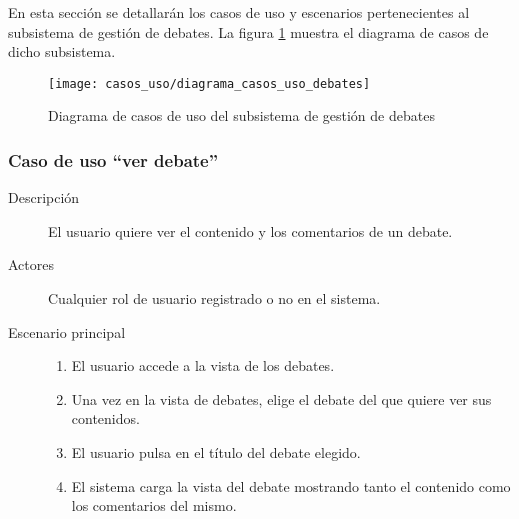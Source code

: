 En esta sección se detallarán los casos de uso y escenarios pertenecientes al subsistema de gestión de debates.
La figura \ref{fig:casos_uso_subsistema_debates} muestra el diagrama de casos de dicho subsistema.

\begin{figure}[h]
\centering
\texttt{[image: casos\_uso/diagrama\_casos\_uso\_debates]}
\caption{Diagrama de casos de uso del subsistema de gestión de debates}
\label{fig:casos_uso_subsistema_debates}
\end{figure}


\subsubsection{Caso de uso ``ver debate''}
\begin{description}
\item[Descripción] 				El usuario quiere ver el contenido y los comentarios de un debate.
\item[Actores] 					Cualquier rol de usuario registrado o no en el sistema.
\item[Escenario principal]	 	\hfill
								\begin{enumerate}
								\item El usuario accede a la vista de los debates.
								\item Una vez en la vista de debates, elige el debate del que quiere ver sus contenidos.
								\item El usuario pulsa en el título del debate elegido.
								\item El sistema carga la vista del debate mostrando tanto el contenido como los comentarios del mismo.
								\end{enumerate}
\end{description}



